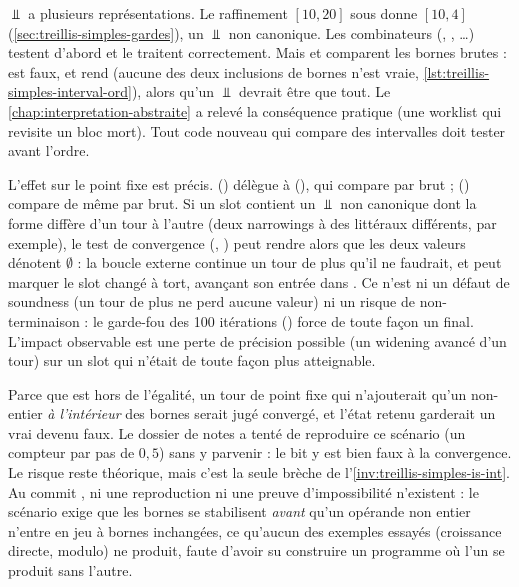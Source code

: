 \begin{piege}
  $\Bot$ a plusieurs représentations. Le raffinement
  $[10,20]$ sous  donne $[10, 4]$ (\cref{sec:treillis-simples-gardes}),
  un $\Bot$ non canonique. Les combinateurs (, ,
  \dots) testent  d'abord et le traitent
  correctement. Mais  et  comparent les
  bornes brutes :  est faux, et
   rend  (aucune des deux
  inclusions de bornes n'est vraie, \cref{lst:treillis-simples-interval-ord}),
  alors qu'un $\Bot$ devrait être  que tout. Le
  \cref{chap:interpretation-abstraite} a relevé la conséquence pratique (une
  worklist qui revisite un bloc mort). Tout code nouveau qui compare des
  intervalles doit tester  avant l'ordre.

  L'effet sur le point fixe est précis. 
  () délègue à
   (), qui compare
  par  brut ; 
  () compare de même par
  \code{!=} brut. Si un slot contient un $\Bot$ non canonique dont la forme
  diffère d'un tour à l'autre (deux narrowings à des littéraux différents,
  par exemple), le test de convergence
  (, )
  peut rendre  alors que les deux valeurs dénotent
  $\emptyset$ : la boucle externe continue un tour de plus qu'il ne
  faudrait, et  peut marquer le slot \og changé\fg{} à
  tort, avançant son entrée dans . Ce n'est ni un défaut de
  soundness (un tour de plus ne perd aucune valeur) ni un risque de
  non-terminaison : le garde-fou des 100 itérations
  () force de toute façon un
   final. L'impact observable est une perte de précision
  possible (un widening avancé d'un tour) sur un slot qui n'était de toute
  façon plus atteignable.
\end{piege}

\begin{piege}
  Parce que  est hors de l'égalité, un tour de point fixe qui
  n'ajouterait qu'un non-entier \emph{à l'intérieur} des bornes serait jugé
  convergé, et l'état retenu garderait un  vrai devenu faux.
  Le dossier de notes a tenté de reproduire ce scénario (un compteur par pas
  de $0{,}5$) sans y parvenir : le bit y est bien faux à la convergence. Le
  risque reste théorique, mais c'est la seule brèche de
  l'\cref{inv:treillis-simples-is-int}. Au commit \snapshotCommit{}, ni une
  reproduction ni une preuve d'impossibilité n'existent : le scénario exige
  que les bornes se stabilisent \emph{avant} qu'un opérande non entier
  n'entre en jeu à bornes inchangées, ce qu'aucun des exemples essayés
  (croissance directe, modulo) ne produit, faute d'avoir su construire un
  programme où l'un se produit sans l'autre.
\end{piege}

